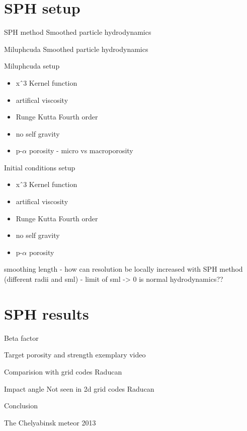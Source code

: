 \documentclass{beamer}
\begin{document}
\section{SPH setup}
\begin{frame}{SPH method}
	Smoothed particle hydrodynamics
\end{frame}
\begin{frame}{Miluphcuda}
	Smoothed particle hydrodynamics
\end{frame}
\begin{frame}{Miluphcuda setup}
	\begin{itemize}
		\item xˆ3 Kernel function \pause
		\item artifical viscosity \pause
		\item Runge Kutta Fourth order \pause
		\item no self gravity \pause
		\item p-$\alpha$ porosity - micro vs macroporosity\pause
	\end{itemize}
\end{frame}
\begin{frame}{Initial conditions setup}
	\begin{itemize}
		\item xˆ3 Kernel function \pause
		\item artifical viscosity \pause
		\item Runge Kutta Fourth order \pause
		\item no self gravity \pause
		\item p-$\alpha$ porosity \pause
	\end{itemize}
\end{frame}
\begin{frame}{smoothing length}
	- how can resolution be locally increased with SPH method (different radii and sml)
	- limit of sml -> 0 is normal hydrodynamics??
\end{frame}
\section{SPH results}
\begin{frame}{Beta factor}
\end{frame}
\begin{frame}{Target porosity and strength}
	exemplary video
\end{frame}
\begin{frame}{Comparision with grid codes}
	Raducan
\end{frame}

\begin{frame}{Impact angle}
	Not seen in 2d grid codes Raducan
\end{frame}
\begin{frame}{Conclusion}
\end{frame}
\begin{frame}[plain]{The Chelyabinsk meteor 2013}
\end{frame}
\end{document}
